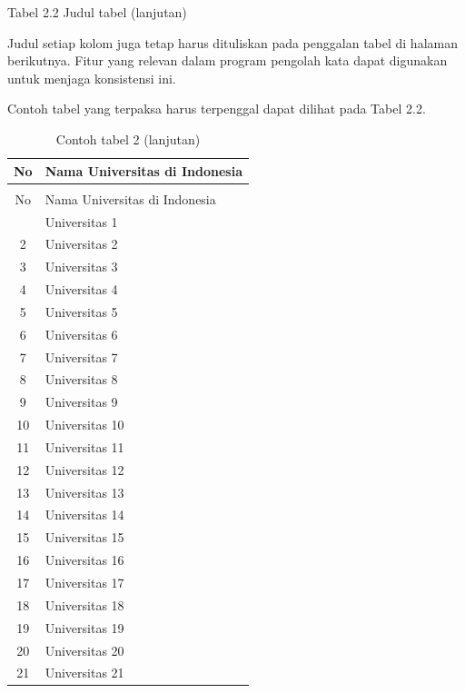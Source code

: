 Tabel 2.2 Judul tabel (lanjutan)

Judul setiap kolom juga tetap harus dituliskan pada penggalan tabel di halaman berikutnya. Fitur yang relevan dalam program pengolah kata dapat digunakan untuk menjaga konsistensi ini. 

Contoh tabel yang terpaksa harus terpenggal dapat dilihat pada Tabel 2.2.

  \begin{longtable}{cl}
    
    \caption{Contoh tabel 2} \\
      \hline
      No & Nama Universitas di Indonesia \\
      \hline
      \endfirsthead
      \caption{Contoh tabel 2 (lanjutan)} \\
      \hline
      No & Nama Universitas di Indonesia \\
      \hline
      \endhead
      \hline
      \endfoot
      1 & Universitas 1 \\
      2 & Universitas 2 \\
      3 & Universitas 3 \\
      4 & Universitas 4 \\
      5 & Universitas 5 \\
      6 & Universitas 6 \\
      7 & Universitas 7 \\
      8 & Universitas 8 \\
      9 & Universitas 9 \\
      10 & Universitas 10 \\
      11 & Universitas 11 \\
      12 & Universitas 12 \\
      13 & Universitas 13 \\
      14 & Universitas 14 \\
      15 & Universitas 15 \\
      16 & Universitas 16 \\
      17 & Universitas 17 \\
      18 & Universitas 18 \\
      19 & Universitas 19 \\
      20 & Universitas 20 \\
      21 & Universitas 21 \\

\end{longtable}
